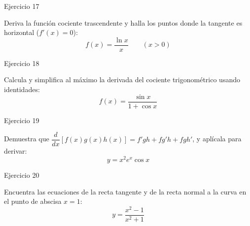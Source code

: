 \documentclass[aspectratio=169]{beamer}
\begin{document}
\begin{frame}{Ejercicio 17}
  \begin{mwejercicio}
    Deriva la función cociente trascendente y halla los puntos donde la tangente es horizontal ($f'(x) = 0$):
    $$f(x) = \frac{\ln x}{x} \qquad (x > 0)$$
  \end{mwejercicio}
  \vspace{3.5cm}
\end{frame}
\begin{frame}{Ejercicio 18}
  \begin{mwejercicio}
    Calcula y simplifica al máximo la derivada del cociente trigonométrico usando identidades:
    $$f(x) = \frac{\sin x}{1 + \cos x}$$
  \end{mwejercicio}
  \vspace{3.5cm}
\end{frame}
\begin{frame}{Ejercicio 19}
  \begin{mwejercicio}
    Demuestra que $\dfrac{d}{dx}[f(x)g(x)h(x)] = f'gh + fg'h + fgh'$, y aplícala para derivar:
    $$y = x^2 e^x \cos x$$
  \end{mwejercicio}
  \vspace{3.5cm}
\end{frame}
\begin{frame}{Ejercicio 20}
  \begin{mwejercicio}
    Encuentra las ecuaciones de la recta tangente y de la recta normal a la curva en el punto de abscisa $x = 1$:
    $$y = \frac{x^2 - 1}{x^2 + 1}$$
  \end{mwejercicio}
  \vspace{3.5cm}
\end{frame}
\end{document}
